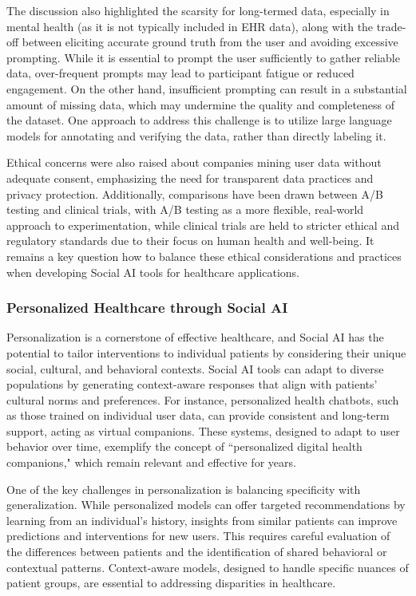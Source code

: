 The discussion also highlighted the scarsity for long-termed data, especially in mental health (as it is not typically included in EHR data), along with the trade-off between eliciting accurate ground truth from the user and avoiding excessive prompting. While it is essential to prompt the user sufficiently to gather reliable data, over-frequent prompts may lead to participant fatigue or reduced engagement. On the other hand, insufficient prompting can result in a substantial amount of missing data, which may undermine the quality and completeness of the dataset. One approach to address this challenge is to utilize large language models for annotating and verifying the data, rather than directly labeling it.

Ethical concerns were also raised about companies mining user data without adequate consent, emphasizing the need for transparent data practices and privacy protection. Additionally, comparisons have been drawn between A/B testing and clinical trials, with A/B testing as a more flexible, real-world approach to experimentation, while clinical trials are held to stricter ethical and regulatory standards due to their focus on human health and well-being. It remains a key question how to balance these ethical considerations and practices when developing Social AI tools for healthcare applications.

\subsubsection{Personalized Healthcare through Social AI}

Personalization is a cornerstone of effective healthcare, and Social AI has the potential to tailor interventions to individual patients by considering their unique social, cultural, and behavioral contexts. Social AI tools can adapt to diverse populations by generating context-aware responses that align with patients' cultural norms and preferences. For instance, personalized health chatbots, such as those trained on individual user data, can provide consistent and long-term support, acting as virtual companions. These systems, designed to adapt to user behavior over time, exemplify the concept of ``personalized digital health companions," which remain relevant and effective for years.

One of the key challenges in personalization is balancing specificity with generalization. While personalized models can offer targeted recommendations by learning from an individual’s history, insights from similar patients can improve predictions and interventions for new users. This requires careful evaluation of the differences between patients and the identification of shared behavioral or contextual patterns. Context-aware models, designed to handle specific nuances of patient groups, are essential to addressing disparities in healthcare.

